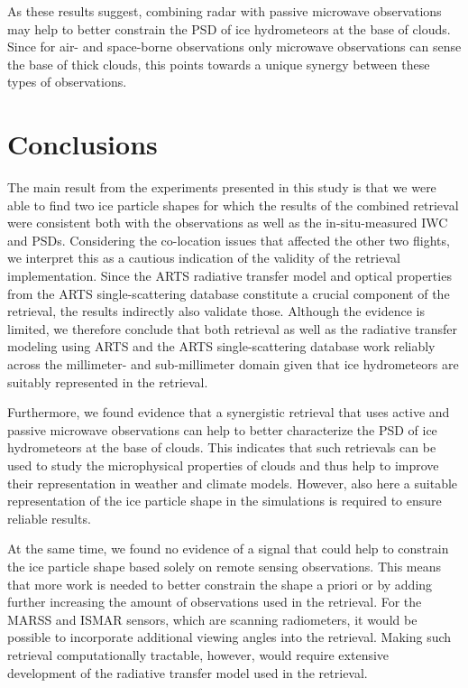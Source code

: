 \documentclass[journal abbreviation, manuscript]{copernicus}
\begin{document}
As these results suggest, combining radar with passive microwave observations
may help to better constrain the PSD of ice hydrometeors at the base of clouds.
Since for air- and space-borne observations only microwave observations can
sense the base of thick clouds, this points towards a unique synergy between
these types of observations.


\section{Conclusions}
\label{sec:conclusions}

The main result from the experiments presented in this study is that we were
able to find two ice particle shapes for which the results of the combined
retrieval were consistent both with the observations as well as the
in-situ-measured IWC and PSDs. Considering the co-location issues that affected
the other two flights, we interpret this as a cautious indication of the
validity of the retrieval implementation. Since the ARTS radiative transfer
model and optical properties from the ARTS single-scattering database constitute
a crucial component of the retrieval, the results indirectly also validate
those. Although the evidence is limited, we therefore conclude that both
retrieval as well as the radiative transfer modeling using ARTS and the ARTS
single-scattering database work reliably across the millimeter- and
sub-millimeter domain given that ice hydrometeors are suitably represented
in the retrieval.

Furthermore, we found evidence that a synergistic retrieval that uses active and
passive microwave observations can help to better characterize the PSD of ice
hydrometeors at the base of clouds. This indicates that such retrievals can be
used to study the microphysical properties of clouds and thus help to improve
their representation in weather and climate models. However, also here a
suitable representation of the ice particle shape in the simulations is required
to ensure reliable results.

At the same time, we found no evidence of a signal that could help to constrain
the ice particle shape based solely on remote sensing observations. This means
that more work is needed to better constrain the shape a priori or by adding
further increasing the amount of observations used in the retrieval. For the
MARSS and ISMAR sensors, which are scanning radiometers, it would be possible to
incorporate additional viewing angles into the retrieval. Making such retrieval
computationally tractable, however, would require extensive development of the
radiative transfer model used in the retrieval.
\end{document}
